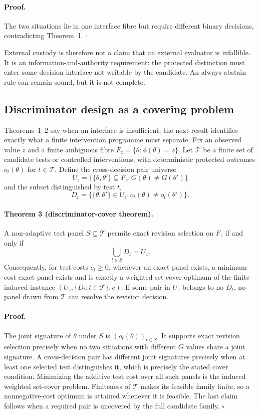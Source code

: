 \paragraph{Proof.}
The two situations lie in one interface fibre but require different binary
decisions, contradicting Theorem~1. \hfill$\square$

External custody is therefore not a claim that an external evaluator is
infallible. It is an information-and-authority requirement: the protected
distinction must enter some decision interface not writable by the candidate.
An always-abstain rule can remain sound, but it is not complete.

\subsection{Discriminator design as a covering problem}

Theorems~1--2 say when an interface is insufficient; the next result identifies
exactly what a finite intervention programme must separate. Fix an observed
value $z$ and a finite ambiguous fibre
$F_z=\{\theta:\phi(\theta)=z\}$. Let $\mathcal T$ be a finite set of candidate tests or
controlled interventions, with deterministic protected outcomes
$o_t(\theta)$ for $t\in\mathcal T$. Define the cross-decision pair universe
\[
 U_z=\bigl\{\{\theta,\theta'\}\subseteq F_z:
 G(\theta)\ne G(\theta')\bigr\}
\]
and the subset distinguished by test $t$,
\[
 D_t=\bigl\{\{\theta,\theta'\}\in U_z:
 o_t(\theta)\ne o_t(\theta')\bigr\}.
\]

\paragraph{Theorem 3 (discriminator-cover theorem).}
A non-adaptive test panel $S\subseteq\mathcal T$ permits exact revision
selection on $F_z$ if and only if
\[
  \bigcup_{t\in S}D_t=U_z.
\]
Consequently, for test costs $c_t\ge0$, whenever an exact panel exists, a
minimum-cost exact panel exists and is exactly a weighted set-cover optimum of
the finite induced instance $(U_z,\{D_t:t\in\mathcal T\},c)$. If some pair in
$U_z$ belongs to no $D_t$, no panel drawn from $\mathcal T$ can resolve the
revision decision.

\paragraph{Proof.}
The joint signature of $\theta$ under $S$ is
$(o_t(\theta))_{t\in S}$. It supports exact revision selection precisely when
no two situations with different $G$ values share a joint signature. A
cross-decision pair has different joint signatures precisely when at least one
selected test distinguishes it, which is precisely the stated cover condition.
Minimizing the additive test cost over all such panels is the induced weighted
set-cover problem.  Finiteness of $\mathcal T$ makes its feasible family finite,
so a nonnegative-cost optimum is attained whenever it is feasible. The last
claim follows when a required pair is uncovered by the full candidate family.
\hfill$\square$


